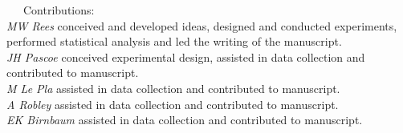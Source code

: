 \documentclass[11pt,a4paper,titlepage,twoside,openright]{style/unimelbthesis}
\begin{document}
\begin{frontmatter}
\begin{preface}
    ~~~Contributions:\\
    \hspace*{0.333em}\hspace*{0.333em}\hspace*{0.333em}\hspace*{0.333em}\hspace*{0.333em}\hspace*{0.333em}\hspace*{0.333em}\hspace*{0.333em}\emph{MW Rees} conceived and developed ideas, designed and conducted experiments, performed statistical analysis and led the writing of the manuscript.\\
    \hspace*{0.333em}\hspace*{0.333em}\hspace*{0.333em}\hspace*{0.333em}\hspace*{0.333em}\hspace*{0.333em}\hspace*{0.333em}\hspace*{0.333em}\emph{JH Pascoe} conceived experimental design, assisted in data collection and contributed to manuscript.\\
    \hspace*{0.333em}\hspace*{0.333em}\hspace*{0.333em}\hspace*{0.333em}\hspace*{0.333em}\hspace*{0.333em}\hspace*{0.333em}\hspace*{0.333em}\emph{M Le Pla} assisted in data collection and contributed to manuscript.\\
    \hspace*{0.333em}\hspace*{0.333em}\hspace*{0.333em}\hspace*{0.333em}\hspace*{0.333em}\hspace*{0.333em}\hspace*{0.333em}\hspace*{0.333em}\emph{A Robley} assisted in data collection and contributed to manuscript.\\
    \hspace*{0.333em}\hspace*{0.333em}\hspace*{0.333em}\hspace*{0.333em}\hspace*{0.333em}\hspace*{0.333em}\hspace*{0.333em}\hspace*{0.333em}\emph{EK Birnbaum} assisted in data collection and contributed to manuscript.\\

\end{preface}
\end{frontmatter}
\end{document}
